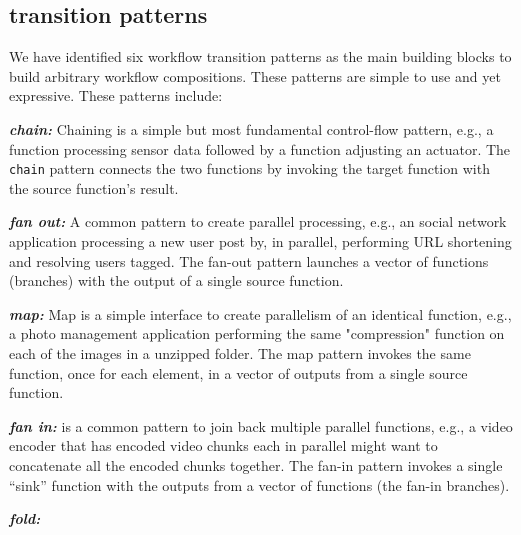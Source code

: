 \subsection{ transition patterns}
\label{sec:transition-patterns}


We have identified six workflow transition patterns as the main building blocks to build arbitrary workflow compositions. These patterns are simple to use and yet expressive. These patterns include: 

\squishlist
	\item \textit{\textbf{chain:} }
		Chaining is a simple but most fundamental control-flow pattern, e.g.,  a function processing sensor data followed by a function adjusting an	actuator. The \texttt{chain} pattern connects the
		two functions by invoking the target function with the source function's
		result. 

	\item \textit{\textbf{fan out:}} 
	A common pattern to create parallel processing,  e.g.,  an social network application processing a new user post by, in parallel, performing
	 URL shortening
	and resolving users tagged. 
	The fan-out pattern
	launches a vector of functions (branches) with the output of a single
	source function. 
	\item \textit{\textbf{map: }} Map is a simple interface to create parallelism of an identical function, e.g.,  a photo management application performing the same "compression" function on
	each of the images in a unzipped folder.  The map pattern invokes the same
function, once for each element, in a vector of outputs from a single source
function.
	\item \textit{\textbf{fan in:}} is a common pattern to join back multiple parallel functions, e.g., a video encoder that has encoded video chunks each in parallel might want to concatenate all the encoded
	chunks together. The fan-in pattern invokes a single ``sink''
	function with the outputs from a vector of functions (the fan-in branches).
	
	\item \textit{\textbf{fold:}}  
	
